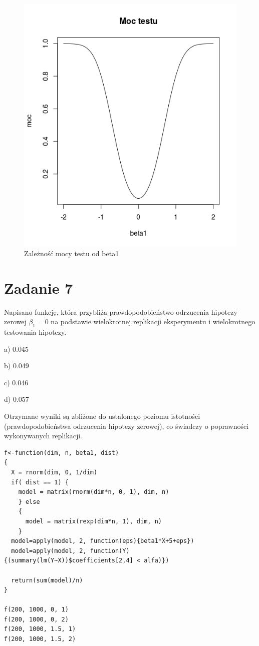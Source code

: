 \documentclass[9pt]{article}  %
\begin{document}
    \begin{figure}[H]
      \centering
      \includegraphics[width=1\textwidth]{6.png}
      \caption {Zależność mocy testu od beta1}
    \end{figure} 

    
\section{Zadanie 7}

Napisano funkcję, która przybliża prawdopodobieństwo odrzucenia hipotezy zerowej $\beta_1 = 0$ na podstawie wielokrotnej replikacji eksperymentu i wielokrotnego testowania hipotezy.   

a) 0.045

b) 0.049

c) 0.046

d) 0.057

Otrzymane wyniki są zbliżone do ustalonego poziomu istotności (prawdopodobieństwa odrzucenia hipotezy zerowej), co świadczy o poprawności wykonywanych replikacji.

    \begin{lstlisting}
f<-function(dim, n, beta1, dist)
{
  X = rnorm(dim, 0, 1/dim)
  if( dist == 1) {
    model = matrix(rnorm(dim*n, 0, 1), dim, n)
    } else 
    {
      model = matrix(rexp(dim*n, 1), dim, n)
    }
  model=apply(model, 2, function(eps){beta1*X+5+eps})
  model=apply(model, 2, function(Y){(summary(lm(Y~X))$coefficients[2,4] < alfa)})
  
  return(sum(model)/n)
}

f(200, 1000, 0, 1)
f(200, 1000, 0, 2)
f(200, 1000, 1.5, 1)
f(200, 1000, 1.5, 2)
    \end{lstlisting}  
\end{document}
